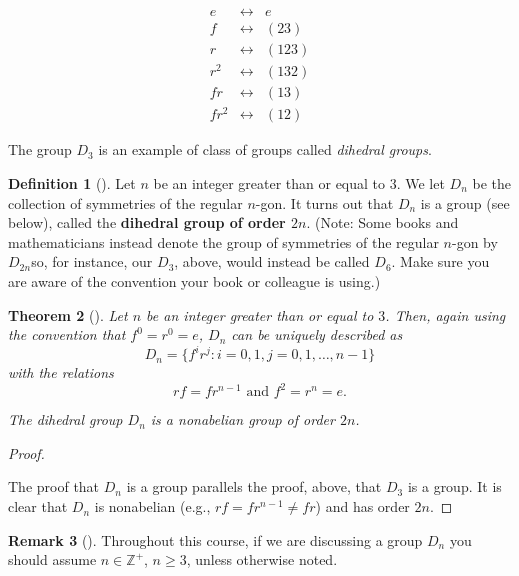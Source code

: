 \documentclass[10pt,]{book}
\newcommand{\terminology}[1]{\textbf{#1}}
\theoremstyle{plain}
\newtheorem{theorem}{Theorem}[section]
\theoremstyle{definition}
\newtheorem{definition}[theorem]{Definition}
\theoremstyle{definition}
\newtheorem{remark}[theorem]{Remark}
\theoremstyle{definition}
\theoremstyle{definition}
\numberwithin{equation}{section}
\def\Z{\mathbb{Z}}
\newcommand{\amp}{&}
\begin{document}
\begin{equation*}
\begin{array}{ccl}
e \amp \leftrightarrow \amp  e\\
f \amp \leftrightarrow \amp  (23)\\
r \amp \leftrightarrow \amp  (123)\\
r^2 \amp \leftrightarrow \amp  (132)\\
fr \amp \leftrightarrow \amp  (13)\\
fr^2 \amp \leftrightarrow \amp  (12)
\end{array}
\end{equation*}
%
\par
The group \(D_3\) is an example of class of groups called \emph{dihedral groups}.%
\begin{definition}[{}]\label{definition-52}
Let \(n\) be an integer greater than or equal to \(3\). We let \(D_n\) be the collection of symmetries of the regular \(n\)-gon. It turns out that \(D_n\) is a group (see below), called the \terminology{dihedral group of order \(2n\)}. (Note: Some books and mathematicians instead denote the group of symmetries of the regular \(n\)-gon by \(D_{2n}\)\textemdash{}so, for instance, our \(D_3\), above, would instead be called \(D_6\). Make sure you are aware of the convention your book or colleague is using.)%
\end{definition}
\begin{theorem}[{}]\label{rf}
Let \(n\) be an integer greater than or equal to \(3\). Then, again using the convention that \(f^0=r^0=e\), \(D_n\) can be uniquely described as%
\begin{equation*}
D_n=\{f^ir^j: i=0,1, j=0,1,\ldots, n-1\}
\end{equation*}
with the relations%
\begin{equation*}
rf=fr^{n-1} \mbox{ and }  f^2=r^n=e.
\end{equation*}
%
\par
The dihedral group \(D_n\) is a nonabelian group of order \(2n\).%
\end{theorem}
\begin{proof}\hypertarget{proof-32}{}
The proof that \(D_n\) is a group parallels the proof, above, that \(D_3\) is a group. It is clear that \(D_n\) is nonabelian (e.g., \(rf=fr^{n-1}\neq fr\)) and has order \(2n\).%
\end{proof}
\begin{remark}[]\label{remark-31}
Throughout this course, if we are discussing a group \(D_n\) you should assume \(n\in \Z^+\), \(n\geq 3\), unless otherwise noted.%
\end{remark}
\end{document}
